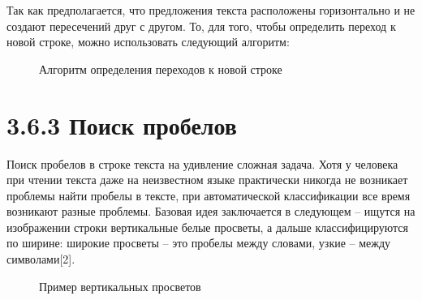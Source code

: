 \documentclass[14pt,a4paper]{extreport}
\begin{document}
\hspace {4ex} Так как предполагается, что предложения текста расположены горизонтально и не создают пересечений друг с другом. То, для того, чтобы определить переход к новой строке, можно использовать следующий алгоритм:\
            
\begin{figure}[h!]
\caption{Алгоритм определения переходов к новой строке}
\end{figure} 

            \section*{\normalsize\hspace{4ex}3.6.3 Поиск пробелов}

\hspace {4ex} Поиск пробелов в строке текста на удивление сложная задача. Хотя у человека при чтении текста даже на неизвестном языке практически никогда не возникает проблемы найти пробелы в тексте, при автоматической классификации все время возникают разные проблемы.
\hspace {4ex} Базовая идея заключается в следующем – ищутся на изображении строки вертикальные белые просветы, а дальше классифицируются по ширине: широкие просветы – это пробелы между словами, узкие – между символами[2].
            
 \begin{figure}[h!]
\caption{Пример вертикальных просветов}
\end{figure}
\end{document}
